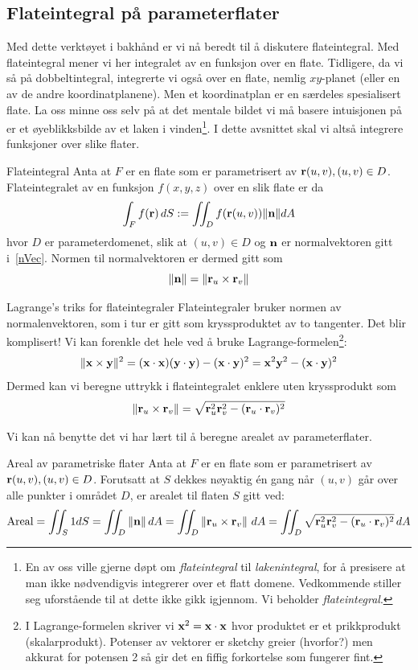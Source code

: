 \subsection{Flateintegral på parameterflater}
Med dette verktøyet i bakhånd er vi nå beredt til å diskutere flateintegral. Med flateintegral mener vi her integralet av en funksjon over en flate. Tidligere, da vi så på dobbeltintegral, integrerte vi også over en flate, nemlig $xy$-planet (eller en av de andre koordinatplanene). Men et koordinatplan er en særdeles spesialisert flate. La oss minne oss selv på at det mentale bildet vi må basere intuisjonen på er et øyeblikksbilde av et laken i vinden\footnote{En av oss ville gjerne døpt om \textit{flateintegral} til \textit{lakenintegral}, for å presisere at man ikke nødvendigvis integrerer over et flatt domene. Vedkommende stiller seg uforstående til at dette ikke gikk igjennom. Vi beholder \textit{flateintegral}.}. I dette avsnittet skal vi altså integrere funksjoner over slike flater.
\begin{defn}{Flateintegral}
Anta at \( F \) er en flate som er parametrisert av $\mathbf{r}(u, v), (u,v)\in D$. Flateintegralet av en  funksjon $f(x,y,z)$ over en slik flate er da
\[\int_F f(\mathbf{r})\, dS := \iint_D f(\mathbf{r}(u,v))\lVert \mathbf{n}\rVert dA\]
hvor $D$ er parameterdomenet, slik at $(u,v)\in D$ og $\mathbf{n}$ er normalvektoren gitt i~\eqref{nVec}. Normen til normalvektoren er dermed gitt som 
\[\lVert \mathbf{n}\rVert=\lVert\mathbf{r}_u \times \mathbf{r}_v\rVert\]
\label{defn:flateintegral}
\end{defn}

\begin{oppsum}{Lagrange's triks for flateintegraler}
Flateintegraler bruker normen av normalenvektoren, som i tur er gitt som kryssproduktet av to tangenter. Det blir komplisert! Vi kan forenkle det hele ved å bruke Lagrange-formelen\footnote{I Lagrange-formelen skriver vi $\mathbf{x}^2 = \mathbf{x}\cdot \mathbf{x}$ hvor produktet er et prikkprodukt (skalarprodukt). Potenser av vektorer er sketchy greier (hvorfor?) men akkurat for potensen 2 så gir det en fiffig forkortelse som fungerer fint.}:
\[\lVert \mathbf{x} \times \mathbf{y}\rVert^2 = (\mathbf{x}\cdot \mathbf{x})(\mathbf{y}\cdot \mathbf{y})-(\mathbf{x}\cdot \mathbf{y})^2=\mathbf{x}^2\mathbf{y}^2-(\mathbf{x}\cdot \mathbf{y})^2\]
Dermed kan vi beregne uttrykk i flateintegralet enklere uten kryssprodukt som
\[\lVert \mathbf{r}_u \times \mathbf{r}_v\rVert=\sqrt{\mathbf{r}_u^2 \mathbf{r}_v^2 - (\mathbf{r}_u \cdot \mathbf{r}_v)^2}\]
\end{oppsum}
Vi kan nå benytte det vi har lært til å beregne arealet av parameterflater. 
\begin{defn}{Areal av parametriske flater}
Anta at \( F \) er en flate som er parametrisert av
$\mathbf{r}(u, v) , (u,v)\in D$. 
Forutsatt at \( S \) dekkes nøyaktig én gang når \( (u, v) \) går over alle punkter i området \( D \), er arealet til flaten \( S \) gitt ved:
\begin{align}\label{surfacearea}
\textrm{Areal} = \iint_S 1 dS = \iint_D\left\|\mathbf{n}\right\|dA=\iint_D \left\| \mathbf{r}_u \times \mathbf{r}_v \right\|\, dA = \iint_D \sqrt{\mathbf{r}_u^2  \mathbf{r}_v^2 - (\mathbf{r}_u \cdot \mathbf{r}_v)^2}\, dA
\end{align}
\end{defn}

